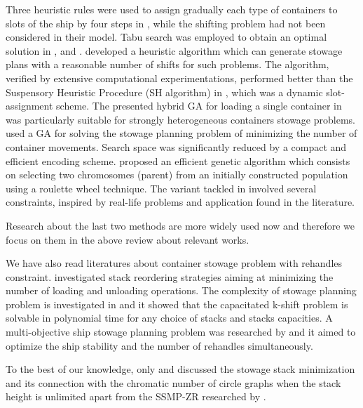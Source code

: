 \documentclass[review,3p,times,authoryear,12pt]{elsarticle}
\begin{document}
Three heuristic rules were used to assign gradually each type of containers to slots of the ship by four steps in \cite{scott1978loading}, while the shifting problem had not been considered in their model.
Tabu search was employed to obtain an optimal solution in \cite{wilson2001container}, \cite{bortfeldt2003parallel} and \cite{monaco2014terminal}.
\cite{ding2015stowage} developed a heuristic algorithm which can generate stowage plans with a reasonable number of shifts for such problems.
The algorithm, verified by extensive computational experimentations, performed better than the Suspensory Heuristic Procedure (SH algorithm) in \cite{avriel1998stowage}, which was a dynamic slot-assignment scheme.
The presented hybrid GA for loading a single container in \cite{bortfeldt2001hybrid} was particularly suitable for strongly heterogeneous containers stowage problems.
\cite{dubrovsky2002genetic}  used a GA for solving the stowage planning problem of minimizing the number of container movements.
Search space was significantly reduced by a compact and efficient encoding scheme.
\cite{kammarti2009evolutionary} proposed an efficient genetic algorithm which consists on selecting two chromosomes (parent) from an initially constructed population using a roulette wheel technique.
The variant tackled in \cite{cohen2017container} involved several constraints, inspired by real-life problems and application found in the literature.

Research about the last two methods are more widely used now and therefore we focus on them in the above review about relevant works.

We have also read literatures about container stowage problem with rehandles constraint.
\cite{malucelli2008stack} investigated stack reordering strategies aiming at minimizing the number of loading and unloading operations.
The complexity of stowage planning problem is investigated in \cite{tierney2014complexity} and it showed that the capacitated k-shift problem is solvable in polynomial time for any choice of stacks and stacks capacities.
A multi-objective ship stowage planning problem was researched by \cite{zhang2016multiobjective} and it aimed to optimize the ship stability and the number of rehandles simultaneously.

To the best of our knowledge, only \cite{avriel2000container} and \cite{jensen2010complexity} discussed the stowage stack minimization and its connection with the chromatic number of circle graphs when the stack height is unlimited apart from the SSMP-ZR researched by \cite{wang2014stowage}.
\end{document}
